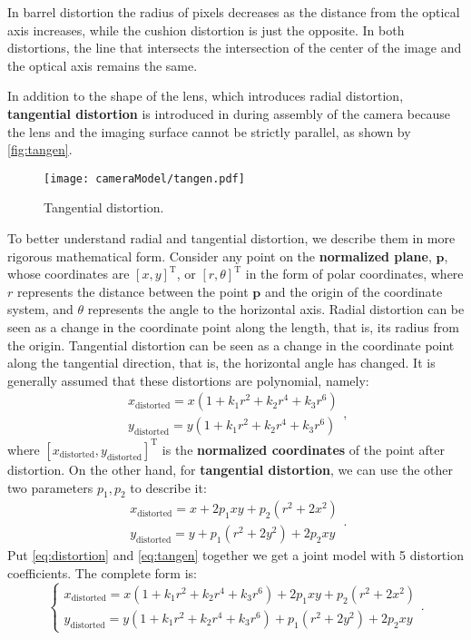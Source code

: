 In barrel distortion the radius of pixels decreases as the distance from the optical axis increases, while the cushion distortion is just the opposite. In both distortions, the line that intersects the intersection of the center of the image and the optical axis remains the same.

In addition to the shape of the lens, which introduces radial distortion, \textbf{tangential distortion} is introduced in during assembly of the camera because the lens and the imaging surface cannot be strictly parallel, as shown by \autoref{fig:tangen}.

\begin{figure}[!t]
	\centering
	\texttt{[image: cameraModel/tangen.pdf]}
	\caption{Tangential distortion.}
	\label{fig:tangen}
\end{figure}

To better understand radial and tangential distortion, we describe them in more rigorous mathematical form. Consider any point on the \textbf{normalized plane}, $\mathbf{p}$, whose coordinates are $[x,y]^\mathrm{T}$, or $[r, \theta]^\mathrm{T}$ in the form of polar coordinates, where $r$ represents the distance between the point $\mathbf{p}$ and the origin of the coordinate system, and $\theta$ represents the angle to the horizontal axis. Radial distortion can be seen as a change in the coordinate point along the length, that is, its radius from the origin. Tangential distortion can be seen as a change in the coordinate point along the tangential direction, that is, the horizontal angle has changed. It is generally assumed that these distortions are polynomial, namely:
\begin{equation}
\label{eq:distortion} 
\begin{matrix}
x_\mathrm{distorted} = x(1+k_1r^2+k_2r^4+k_3r^6)\\
y_\mathrm{distorted} = y(1+k_1r^2+k_2r^4+k_3r^6)
\end{matrix},
\end{equation}
where $[x_\mathrm{distorted}, y_\mathrm{distorted}]^\mathrm{T}$ is the \textbf{normalized coordinates} of the point after distortion. On the other hand, for \textbf{tangential distortion}, we can use the other two parameters $p_1,p_2$ to describe it:
\begin{equation}
\label{eq:tangen} 
\begin{matrix}
x_\mathrm{distorted} = x+2p_1xy+p_2(r^2+2x^2)\\
y_\mathrm{distorted} = y+p_1(r^2+2y^2)+2p_2xy
\end{matrix}. 
\end{equation}
Put \eqref{eq:distortion} and \eqref{eq:tangen} together we get a joint model with 5 distortion coefficients. The complete form is:
\begin{equation}
\left\{\begin{matrix} x_\mathrm{distorted} =x(1+k_1r^2+k_2r^4+k_3r^6)+2p_1xy+p_2(r^2+2x^2)\\ 
y_\mathrm{distorted} = y(1+k_1r^2+k_2r^4+k_3r^6)+p_1(r^2+2y^2)+2p_2xy
\end{matrix}\right. .
\end{equation}

